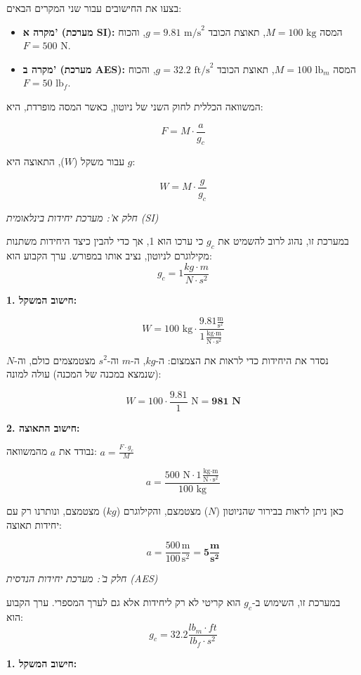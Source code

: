 \documentclass[
  hebrew,
  letterpaper,
  DIV=11,
  numbers=noendperiod]{scrreprt}
\providecommand{\tightlist}{%
  \setlength{\itemsep}{0pt}\setlength{\parskip}{0pt}}
\begin{document}
בצעו את החישובים עבור שני המקרים הבאים:

\begin{itemize}
\tightlist
\item
  \textbf{מקרה א' (מערכת SI):} המסה \(M=100 \text{ kg}\), תאוצת הכובד
  \(g=9.81 \text{ m/s}^2\), והכוח \(F=500 \text{ N}\).
\item
  \textbf{מקרה ב' (מערכת AES):} המסה \(M=100 \text{ lb}_m\), תאוצת הכובד
  \(g=32.2 \text{ ft/s}^2\), והכוח \(F=50 \text{ lb}_f\).
\end{itemize}

המשוואה הכללית לחוק השני של ניוטון, כאשר המסה מופרדת, היא:

\[
F = M \cdot \frac{a}{g_c}
\]

עבור משקל (\(W\)), התאוצה היא \(g\):

\[
W = M \cdot \frac{g}{g_c}
\]

\emph{חלק א': מערכת יחידות בינלאומית (SI)}

במערכת זו, נהוג לרוב להשמיט את \(g_c\) כי ערכו הוא 1, אך כדי להבין כיצד
היחידות משתנות מקילוגרם לניוטון, נציב אותו במפורש. ערך הקבוע הוא:
\[g_c = 1 \frac{kg \cdot m}{N \cdot s^2}\]

\textbf{1. חישוב המשקל:}

\[
W = 100 \text{ kg} \cdot \frac{9.81 \frac{\text{m}}{\text{s}^2}}{1 \frac{\text{kg} \cdot \text{m}}{\text{N} \cdot \text{s}^2}}
\]

נסדר את היחידות כדי לראות את הצמצום: ה-\(kg\), ה-\(m\) וה-\(s^2\)
מצטמצמים כולם, וה-\(N\) (שנמצא במכנה של המכנה) עולה למונה:

\[
W = 100 \cdot \frac{9.81}{1} \text{ N} = \mathbf{981 \text{ N}}
\]

\textbf{2. חישוב התאוצה:}

נבודד את \(a\) מהמשוואה: \(a = \frac{F \cdot g_c}{M}\)

\[
a = \frac{500 \text{ N} \cdot 1 \frac{\text{kg} \cdot \text{m}}{\text{N} \cdot \text{s}^2}}{100 \text{ kg}}
\]

כאן ניתן לראות בבירור שהניוטון (\(N\)) מצטמצם, והקילוגרם (\(kg\))
מצטמצם, ונותרנו רק עם יחידות תאוצה:

\[
a = \frac{500}{100} \frac{\text{m}}{\text{s}^2} = \mathbf{5 \frac{\text{m}}{\text{s}^2}}
\]

\emph{חלק ב': מערכת יחידות הנדסית (AES)}

במערכת זו, השימוש ב-\(g_c\) הוא קריטי לא רק ליחידות אלא גם לערך המספרי.
ערך הקבוע הוא: \[g_c = 32.2 \frac{lb_m \cdot ft}{lb_f \cdot s^2}\]

\textbf{1. חישוב המשקל:}
\end{document}
